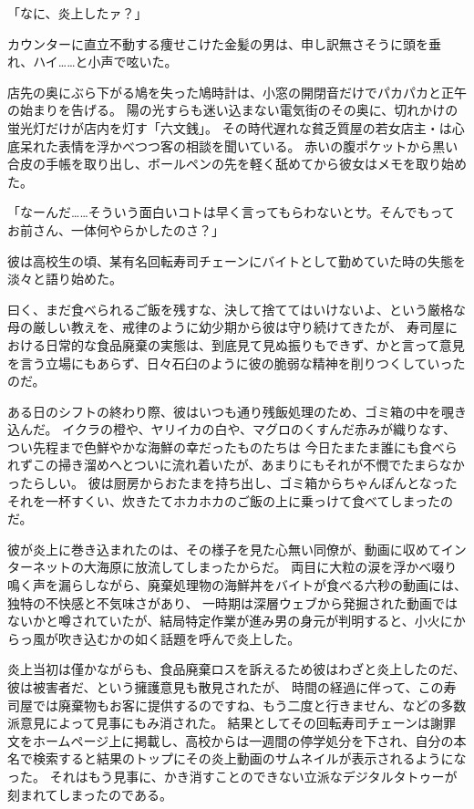 
「なに、炎上したァ？」

カウンターに直立不動する痩せこけた金髪の男は、申し訳無さそうに頭を垂れ、ハイ……と小声で呟いた。

店先の奥にぶら下がる鳩を失った鳩時計は、小窓の開閉音だけでパカパカと正午の始まりを告げる。
陽の光すらも迷い込まない電気街のその奥に、切れかけの蛍光灯だけが店内を灯す「六文銭」。
その時代遅れな貧乏質屋の若女店主・は心底呆れた表情を浮かべつつ客の相談を聞いている。
赤いの腹ポケットから黒い合皮の手帳を取り出し、ボールペンの先を軽く舐めてから彼女はメモを取り始めた。

「なーんだ……そういう面白いコトは早く言ってもらわないとサ。そんでもってお前さん、一体何やらかしたのさ？」

彼は高校生の頃、某有名回転寿司チェーンにバイトとして勤めていた時の失態を淡々と語り始めた。

曰く、まだ食べられるご飯を残すな、決して捨ててはいけないよ、という厳格な母の厳しい教えを、戒律のように幼少期から彼は守り続けてきたが、
寿司屋における日常的な食品廃棄の実態は、到底見て見ぬ振りもできず、かと言って意見を言う立場にもあらず、日々石臼のように彼の脆弱な精神を削りつくしていったのだ。

ある日のシフトの終わり際、彼はいつも通り残飯処理のため、ゴミ箱の中を覗き込んだ。
イクラの橙や、ヤリイカの白や、マグロのくすんだ赤みが織りなす、つい先程まで色鮮やかな海鮮の幸だったものたちは
今日たまたま誰にも食べられずこの掃き溜めへとついに流れ着いたが、あまりにもそれが不憫でたまらなかったらしい。
彼は厨房からおたまを持ち出し、ゴミ箱からちゃんぽんとなったそれを一杯すくい、炊きたてホカホカのご飯の上に乗っけて食べてしまったのだ。

彼が炎上に巻き込まれたのは、その様子を見た心無い同僚が、動画に収めてインターネットの大海原に放流してしまったからだ。
両目に大粒の涙を浮かべ啜り鳴く声を漏らしながら、廃棄処理物の海鮮丼をバイトが食べる六秒の動画には、独特の不快感と不気味さがあり、
一時期は深層ウェブから発掘された動画ではないかと噂されていたが、結局特定作業が進み男の身元が判明すると、小火にからっ風が吹き込むかの如く話題を呼んで炎上した。

炎上当初は僅かながらも、食品廃棄ロスを訴えるため彼はわざと炎上したのだ、彼は被害者だ、という擁護意見も散見されたが、
時間の経過に伴って、この寿司屋では廃棄物もお客に提供するのですね、もう二度と行きません、などの多数派意見によって見事にもみ消された。
結果としてその回転寿司チェーンは謝罪文をホームページ上に掲載し、高校からは一週間の停学処分を下され、自分の本名で検索すると結果のトップにその炎上動画のサムネイルが表示されるようになった。
それはもう見事に、かき消すことのできない立派なデジタルタトゥーが刻まれてしまったのである。

